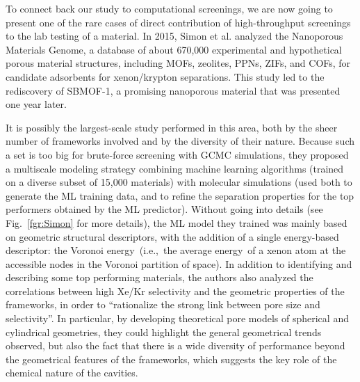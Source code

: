 \documentclass[main.tex]{subfiles}
\begin{document}
To connect back our study to computational screenings, we are now going to present one of the rare cases of direct contribution of high-throughput screenings to the lab testing of a material. In 2015, Simon et al.\cite{Simon_2015} analyzed the Nanoporous Materials Genome,\cite{Simon_2015_EES, Boyd_2017} a database of about 670,000 experimental and hypothetical porous material structures, including MOFs, zeolites, PPNs, ZIFs, and COFs, for candidate adsorbents for xenon/krypton separations. This study led to the rediscovery of SBMOF-1, a promising nanoporous material that was presented one year later.\cite{Banerjee_2016}

It is possibly the largest-scale study performed in this area, both by the sheer number of frameworks involved and by the diversity of their nature. Because such a set is too big for brute-force screening with GCMC simulations, they proposed a multiscale modeling strategy combining machine learning algorithms (trained on a diverse subset of 15,000 materials) with molecular simulations (used both to generate the ML training data, and to refine the separation properties for the top performers obtained by the ML predictor). Without going into details (see Fig.~\ref{fgr:Simon} for more details), the ML model they trained was mainly based on geometric structural descriptors, with the addition of a single energy-based descriptor: the Voronoi energy\ (i.e.,\ the average energy\ of a xenon atom at the accessible nodes in the Voronoi partition of space). In addition to identifying and describing some top performing materials, the authors also analyzed the correlations between high Xe/Kr selectivity and the geometric properties of the frameworks, in order to ``rationalize the strong link between pore size and selectivity''. In particular, by developing theoretical pore models of spherical and cylindrical geometries, they could highlight the general geometrical trends observed, but also the fact that there is a wide diversity of performance beyond the geometrical features of the frameworks, which suggests the key role of the chemical nature of the cavities.
\end{document}
